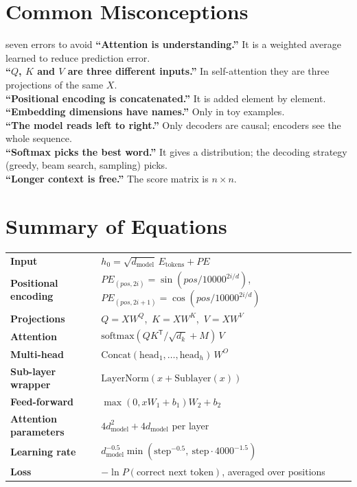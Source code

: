 \documentclass[11pt]{article}
\begin{document}
\section{Common Misconceptions}
\begin{pitfall}{seven errors to avoid}
\textbf{``Attention is understanding.''} It is a weighted average learned to reduce prediction error.\\
\textbf{``$Q$, $K$ and $V$ are three different inputs.''} In self-attention they are three projections of the same $X$.\\
\textbf{``Positional encoding is concatenated.''} It is added element by element.\\
\textbf{``Embedding dimensions have names.''} Only in toy examples.\\
\textbf{``The model reads left to right.''} Only decoders are causal; encoders see the whole sequence.\\
\textbf{``Softmax picks the best word.''} It gives a distribution; the decoding strategy (greedy, beam search, sampling) picks.\\
\textbf{``Longer context is free.''} The score matrix is $n\times n$.
\end{pitfall}

\section{Summary of Equations}
\begin{center}\small\renewcommand{\arraystretch}{1.6}
\begin{tabular}{ll}\toprule
\textbf{Input} & $h_0=\sqrt{d_{\text{model}}}\,E_{\text{tokens}}+PE$\\
\textbf{Positional encoding} & $PE_{(pos,2i)}=\sin(pos/10000^{2i/d})$,\ $PE_{(pos,2i+1)}=\cos(pos/10000^{2i/d})$\\
\textbf{Projections} & $Q=XW^Q$,\ $K=XW^K$,\ $V=XW^V$\\
\textbf{Attention} & $\text{softmax}(QK^{\mathsf T}/\sqrt{d_k}+M)\,V$\\
\textbf{Multi-head} & $\text{Concat}(\text{head}_1,\dots,\text{head}_h)\,W^O$\\
\textbf{Sub-layer wrapper} & $\text{LayerNorm}(x+\text{Sublayer}(x))$\\
\textbf{Feed-forward} & $\max(0,xW_1+b_1)W_2+b_2$\\
\textbf{Attention parameters} & $4d_{\text{model}}^2+4d_{\text{model}}$ per layer\\
\textbf{Learning rate} & $d_{\text{model}}^{-0.5}\min(\text{step}^{-0.5},\ \text{step}\cdot4000^{-1.5})$\\
\textbf{Loss} & $-\ln P(\text{correct next token})$, averaged over positions\\\bottomrule
\end{tabular}\end{center}
\end{document}
